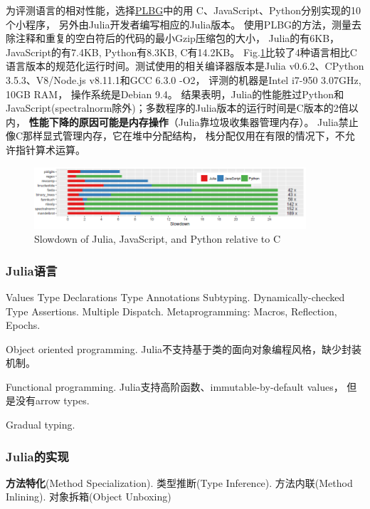 为评测语言的相对性能，选择\href{https://benchmarksgame-team.pages.debian.net/benchmarksgame/}{PLBG}中的用
C、JavaScript、Python分别实现的10个小程序，
另外由Julia开发者编写相应的Julia版本。
使用PLBG的方法，测量去除注释和重复的空白符后的代码的最小Gzip压缩包的大小，
Julia的有6KB，JavaScript的有7.4KB, Python有8.3KB, C有14.2KB。
Fig.\ref{fig:julia:slowdown}比较了4种语言相比C语言版本的规范化运行时间。测试使用的相关编译器版本是Julia v0.6.2、CPython 3.5.3、V8/Node.js v8.11.1和GCC 6.3.0 -O2，
评测的机器是Intel i7-950 3.07GHz, 10GB RAM，
操作系统是Debian 9.4。
结果表明，Julia的性能胜过Python和JavaScript(spectralnorm除外)；多数程序的Julia版本的运行时间是C版本的2倍以内，
\textbf{性能下降的原因可能是内存操作}（Julia靠垃圾收集器管理内存）。
Julia禁止像C那样显式管理内存，它在堆中分配结构，
栈分配仅用在有限的情况下，不允许指针算术运算。
\begin{figure}[htbp]
    \centering
    \includegraphics[width=0.9\textwidth]{img/julia-perf.png}
    \caption{Slowdown of Julia, JavaScript, and Python relative to C}
    \label{fig:julia:slowdown}
\end{figure}

\subsubsection{Julia语言}
\label{paper:oopsla2018Julia:lang}
Values
Type Declarations
Type Annotations
Subtyping.
Dynamically-checked Type Assertions.
Multiple Dispatch.
Metaprogramming: Macros, Reflection, Epochs.

Object oriented programming. Julia不支持基于类的面向对象编程风格，缺少封装机制。

Functional programming.
Julia支持高阶函数、immutable-by-default values，
但是没有arrow types.

Gradual typing.

\subsubsection{Julia的实现}
\label{paper:oopsla2018Julia:impl}
\textbf{方法特化}(Method Specialization).
类型推断(Type Inference).
方法内联(Method Inlining).
对象拆箱(Object Unboxing)


